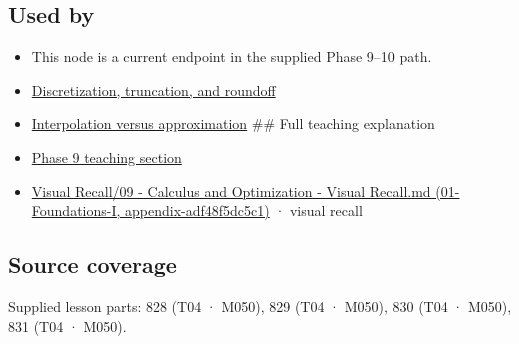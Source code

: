 \subsection{Used by}\label{appendix-32f39e9a3738-used-by}

\begin{itemize}
\item
  This node is a current endpoint in the supplied Phase 9--10 path.
\item
  \hyperref[appendix-6b0648b2b8e8]{Discretization, truncation, and roundoff}
\item
  \hyperref[appendix-0c2a5f69851e]{Interpolation versus approximation} \#\# Full teaching explanation
\item
  \hyperref[02-foundations-ii-ch021-jacobians-curvature-and-local-approximation]{Phase 9 teaching section}
\item
  \href{../01-Foundations-I/main.pdf\#nameddest=appendix-adf48f5dc5c1}{Visual Recall/09 - Calculus and Optimization - Visual Recall.md (01-Foundations-I, appendix-adf48f5dc5c1)} · visual recall
\end{itemize}

\subsection{Source coverage}\label{appendix-32f39e9a3738-source-coverage}

Supplied lesson parts: 828 (T04 · M050), 829 (T04 · M050), 830 (T04 · M050), 831 (T04 · M050).

